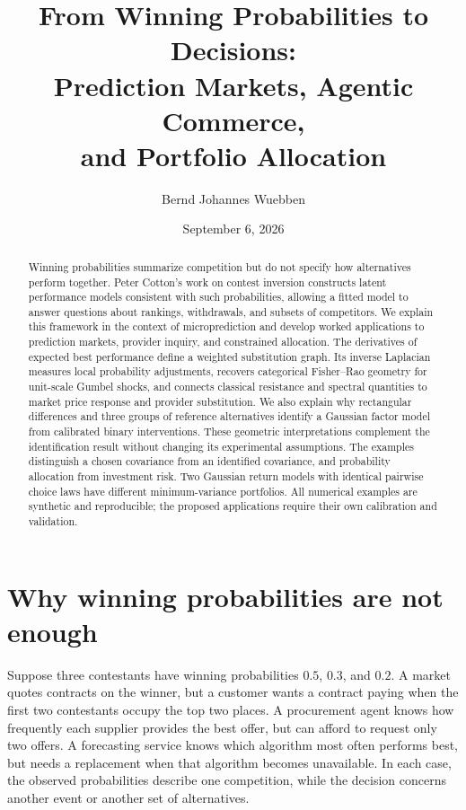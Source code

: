 \documentclass[11pt]{amsart}
\title[From Winning Probabilities to Decisions]{From Winning Probabilities to Decisions:\\ Prediction Markets, Agentic Commerce,\\ and Portfolio Allocation}
\author{Bernd Johannes Wuebben}
\date{September 6, 2026}
\theoremstyle{definition}
\begin{document}
\begin{abstract}
Winning probabilities summarize competition but do not specify how alternatives perform together. Peter Cotton's work on contest inversion constructs latent performance models consistent with such probabilities, allowing a fitted model to answer questions about rankings, withdrawals, and subsets of competitors. We explain this framework in the context of microprediction and develop worked applications to prediction markets, provider inquiry, and constrained allocation. The derivatives of expected best performance define a weighted substitution graph. Its inverse Laplacian measures local probability adjustments, recovers categorical Fisher--Rao geometry for unit-scale Gumbel shocks, and connects classical resistance and spectral quantities to market price response and provider substitution. We also explain why rectangular differences and three groups of reference alternatives identify a Gaussian factor model from calibrated binary interventions. These geometric interpretations complement the identification result without changing its experimental assumptions. The examples distinguish a chosen covariance from an identified covariance, and probability allocation from investment risk. Two Gaussian return models with identical pairwise choice laws have different minimum-variance portfolios. All numerical examples are synthetic and reproducible; the proposed applications require their own calibration and validation.
\end{abstract}
\maketitle
\enlargethispage{2pt}

\section{Why winning probabilities are not enough}

Suppose three contestants have winning probabilities $0.5$, $0.3$, and $0.2$. A market quotes contracts on the winner, but a customer wants a contract paying when the first two contestants occupy the top two places. A procurement agent knows how frequently each supplier provides the best offer, but can afford to request only two offers. A forecasting service knows which algorithm most often performs best, but needs a replacement when that algorithm becomes unavailable. In each case, the observed probabilities describe one competition, while the decision concerns another event or another set of alternatives.
\end{document}
